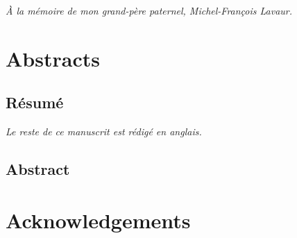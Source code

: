 \documentclass{these-dbl}
\begin{document}
\renewcommand{\thepage}{}



\cleardoublepage

\vspace*{\fill}
\begin{center}
  \textit{À la mémoire de mon grand-père paternel, Michel-François Lavaur.}
\end{center}
\vspace*{\fill}

\clearemptydoublepage
\frontmatter
\renewcommand{\thepage}{\roman{page}}%



\chapter*{Abstracts\label{chap:abstracts}}

\section*{Résumé}


\vfill
\begin{center}
  \textit{Le reste de ce manuscrit est rédigé en anglais.}
\end{center}
\vfill\vfill
\newpage

\section*{Abstract}



\clearemptydoublepage
\chapter*{Acknowledgements\label{chap:ack}}


\end{document}
